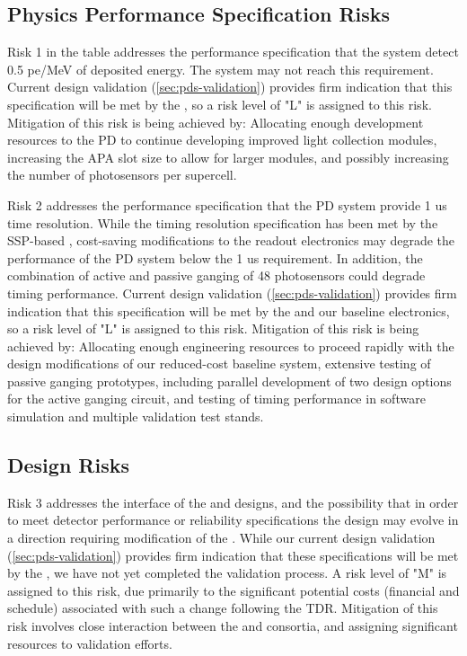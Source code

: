 \subsection{Physics Performance Specification Risks}

Risk 1 in the table addresses the performance specification that the  system detect 0.5 pe/MeV of deposited energy.  The system may not reach this requirement.  Current design validation (\ref{sec:pds-validation}) provides firm indication that this specification will be met by the , so a risk level of "L" is assigned to this risk.  Mitigation of this risk is being achieved by:  Allocating enough development resources to the PD to continue developing improved light collection modules, increasing the APA slot size to allow for larger modules, and possibly increasing the number of photosensors per  supercell.

Risk 2 addresses the performance specification that the PD system provide 1 us time resolution.  While the timing resolution specification has been met by the  SSP-based ,  cost-saving modifications to the readout electronics may degrade the performance of the PD system below the 1 us requirement.  In addition, the combination of active and passive ganging of 48 photosensors could degrade timing performance.  Current design validation (\ref{sec:pds-validation}) provides firm indication that this specification will be met by the  and our baseline electronics, so a risk level of "L" is assigned to this risk.  Mitigation of this risk is being achieved by:  Allocating enough engineering resources to proceed rapidly with the design modifications of our reduced-cost baseline system, extensive testing of passive ganging prototypes, including parallel development of two design options for the active ganging circuit, and testing of timing performance in software simulation and multiple validation test stands.


\subsection{Design Risks}

Risk 3 addresses the interface of the  and  designs, and the possibility that in order to meet detector performance or reliability specifications the  design may evolve in a direction requiring modification of the .  While our current design validation (\ref{sec:pds-validation}) provides firm indication that these specifications will be met by the , we have not yet completed the validation process.  A risk level of "M" is assigned to this risk, due primarily to the significant potential costs (financial and schedule) associated with such a change following the TDR.  Mitigation of this risk involves close interaction between the  and  consortia, and assigning significant resources to  validation efforts.

